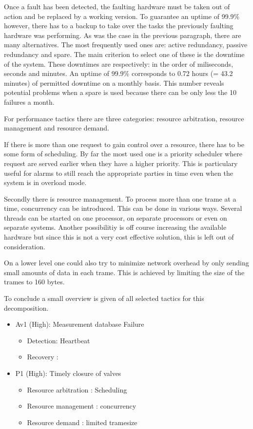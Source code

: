 \npar Once a fault has been detected, the faulting hardware must be taken out of
action and be replaced by a working version. To guarantee an uptime of 99.9\%
however, there has to a backup to take over the tasks the previously faulting
hardware was performing. As was the case in the previous paragraph, there are
many alternatives. The most frequently used ones are: active redundancy, passive
redundancy and spare. The main criterion to select one of these is the downtime
of the system. These downtimes are respectively: in the order of miliseconds,
seconds and minutes. An uptime of 99.9\% corresponds to 0.72 hours (= 43.2
minutes) of permitted downtime on a monthly basis. This number reveals potential
problems when a spare is used because there can be only less the 10 failures a
month. %

\npar For performance tactics there are three categories: resource
arbitration, resource management and resource demand.

\npar If there is more than one request to gain control over a resource, there
has to be some form of scheduling. By far the most used one is a priority
scheduler where request are served earlier when they have a higher priority.
This is particulary useful for alarms to still reach the appropriate parties in
time even when the system is in overload mode. 

\npar Secondly there is resource management. To process more than one trame at a
time, concurrency can be introduced. This can be done in various ways. Several
threads can be started on one processor, on separate processors or even on
separate systems. Another possibilitiy is off course increasing the available
hardware but since this is not a very cost effective solution, this is left out
of consideration.

\npar On a lower level one could also try to minimize network overhead by
only sending small amounts of data in each trame. This is achieved by
limiting the size of the trames to 160 bytes.

\npar To conclude a small overview is given of all selected tactics for this
decomposition.

\begin{itemize}
 	\item Av1 (High): Measurement database Failure
 	\begin{itemize}
 		\item Detection: Heartbeat 
 		\item Recovery : %
 	\end{itemize}
  	\item P1 (High): Timely closure of valves
  	\begin{itemize}
  		\item Resource arbitration : Scheduling
		\item Resource management  : concurrency
		\item Resource demand      : limited tramesize
  	\end{itemize}
\end{itemize}

